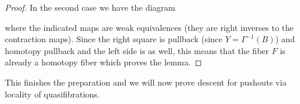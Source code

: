 \begin{lemma}
\begin{proof}
        In the second case we have the diagram
        \begin{center}
        \end{center}
        where the indicated maps are weak equivalences (they are right inverses to the contraction maps).
        Since the right square is pullback (since $Y=\Gamma^{-1}(B)$) and homotopy pullback and the left side is as well, this means that the fiber $F$ is already a homotopy fiber which proves the lemma.
    \end{proof}
\end{lemma}
This finishes the preparation and we will now prove descent for pushouts via locality of quasifibrations.
